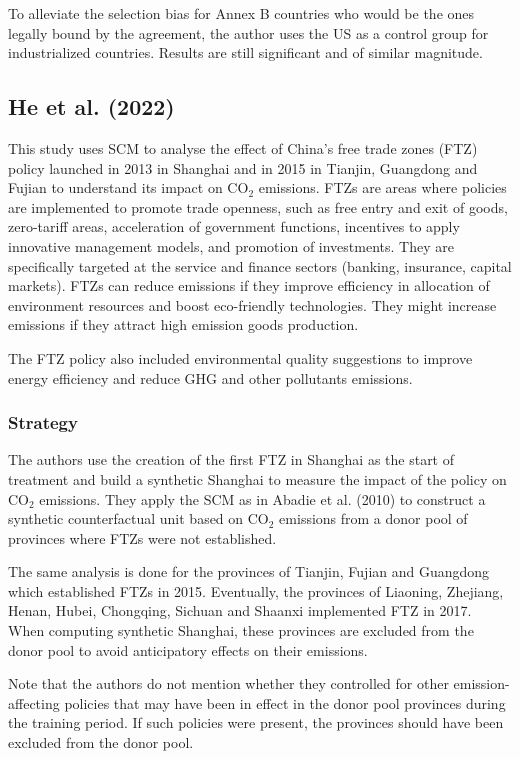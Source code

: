 \documentclass[12pt,a4paper,draft]{article}
\begin{document}
To alleviate the selection bias for Annex B countries who would be the ones legally bound by the 
agreement, the author uses the US as a control group for industrialized countries. Results are still 
significant and of similar magnitude.


\subsection{He et al. (2022)}
This study uses SCM to analyse the effect of China's free trade zones (FTZ) policy 
launched in 2013 in Shanghai and in 2015 in Tianjin, Guangdong and Fujian to 
understand its impact on CO$_2$ emissions. 
FTZs are areas where policies are implemented to promote trade openness, such as 
free entry and exit of goods, zero-tariff areas, acceleration of government functions, 
incentives to apply innovative management models, and promotion of investments. 
They are specifically targeted at the service and 
finance sectors (banking, insurance, capital markets). 
FTZs can reduce emissions if they improve efficiency in allocation 
of environment resources and boost eco-friendly technologies. They might increase 
emissions if they attract high emission goods production.

The FTZ policy also included environmental quality suggestions to improve energy 
efficiency and reduce GHG and other pollutants emissions. 

\subsubsection*{Strategy}
The authors use the creation of the first FTZ in Shanghai as the start of treatment 
and build a synthetic Shanghai to measure the impact of the policy on CO$_2$ 
emissions. They apply the SCM as in Abadie et al. (2010) to construct a synthetic 
counterfactual unit based on CO$_2$ emissions from a donor pool of provinces 
where FTZs were not established. 

The same analysis is done for the provinces of Tianjin, Fujian and Guangdong 
which established FTZs in 2015. Eventually, the provinces of Liaoning, 
Zhejiang, Henan, Hubei, Chongqing, Sichuan and Shaanxi implemented FTZ in 2017.
When computing synthetic Shanghai, these provinces are excluded from the donor 
pool to avoid anticipatory effects on their emissions.

Note that the authors do not mention whether they controlled for other 
emission-affecting policies that may have been in effect in the donor pool 
provinces during the training period. If such policies were present, the 
provinces should have been excluded from the donor pool.
\end{document}

